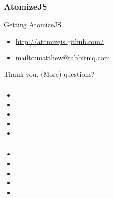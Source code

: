 \documentclass{beamer}
\begin{document}
\begin{frame}
  \frametitle{AtomizeJS}

  \begin{block}{Getting AtomizeJS}
    \begin{itemize}
    \item
      \url{http://atomizejs.github.com/}
    \item
      \url{mailto:matthew@rabbitmq.com}
    \end{itemize}
  \end{block}
\end{frame}

\begin{frame}
  \centering
  \LARGE

  Thank you. (More) questions?

\end{frame}

\begin{frame}
  \frametitle{}

  \begin{block}{}
    \begin{itemize}
    \item

    \item

    \item

    \item

    \item

    \end{itemize}
  \end{block}
\end{frame}

\begin{frame}
  \frametitle{}

  \begin{block}{}
    \begin{itemize}
    \item

    \item

    \item

    \item

    \item

    \end{itemize}
  \end{block}
\end{frame}
\end{document}
